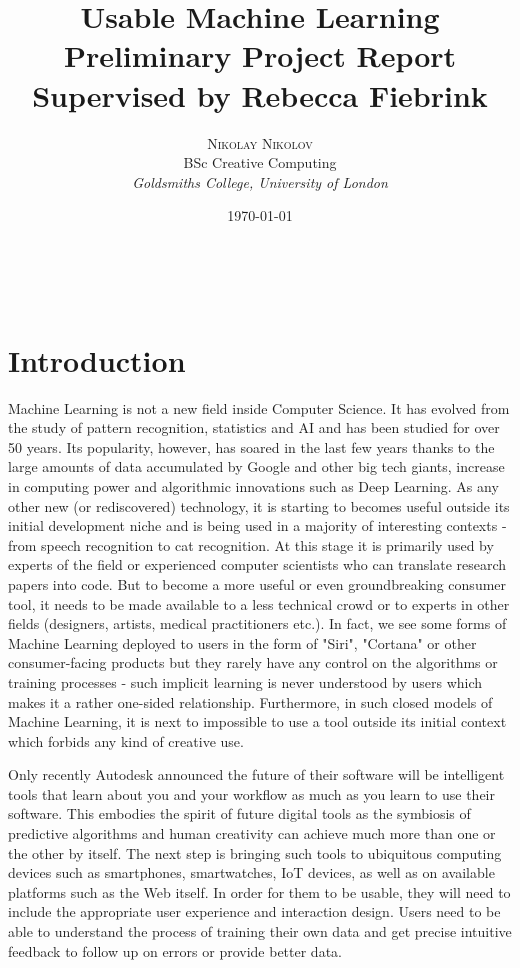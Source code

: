 \documentclass[a4paper, 11pt]{article}
\title{\textbf{Usable Machine Learning}\\ %
  Preliminary Project Report \\
  \large Supervised by Rebecca Fiebrink} %
\author{\textsc{Nikolay Nikolov} %
  \\{BSc Creative Computing} %
  \\{\textit{Goldsmiths College, University of London}}} %
\date{\today} %
\makeatletter
\renewcommand{\maketitle}{ %
    \begin{flushright} %
      {\LARGE\@title} %

      \vspace{50pt} %

      {\large\@author} %
      \\\@date %

      \vspace{40pt} %
    \end{flushright}
  }
\makeatother
\begin{document}
  \maketitle %


  \section{Introduction}
  Machine Learning is not a new field inside Computer Science. It has evolved from the study of pattern recognition, statistics and AI and has been studied for over 50 years. Its popularity, however, has soared in the last few years thanks to the large amounts of data accumulated by Google and other big tech giants, increase in computing power and algorithmic innovations such as Deep Learning. As any other new (or rediscovered) technology, it is starting to becomes useful outside its initial development niche and is being used in a majority of interesting contexts - from speech recognition to cat recognition. At this stage it is primarily used by experts of the field or experienced computer scientists who can translate research papers into code. But to become a more useful or even groundbreaking consumer tool, it needs to be made available to a less technical crowd or to experts in other fields (designers, artists, medical practitioners etc.). In fact, we see some forms of Machine Learning deployed to users in the form of "Siri", "Cortana" or other consumer-facing products but they rarely have any control on the algorithms or training processes - such implicit learning is never understood by users which makes it a rather one-sided relationship. Furthermore, in such closed models of Machine Learning, it is next to impossible to use a tool outside its initial context which forbids any kind of creative use.

  Only recently Autodesk announced the future of their software will be intelligent tools that learn about you and your workflow as much as you learn to use their software. This embodies the spirit of future digital tools as the symbiosis of predictive algorithms and human creativity can achieve much more than one or the other by itself. The next step is bringing such tools to ubiquitous computing devices such as smartphones, smartwatches, IoT devices, as well as on available platforms such as the Web itself. In order for them to be usable, they will need to include the appropriate user experience and interaction design. Users need to be able to understand the process of training their own data and get precise intuitive feedback to follow up on errors or provide better data.
\end{document}
